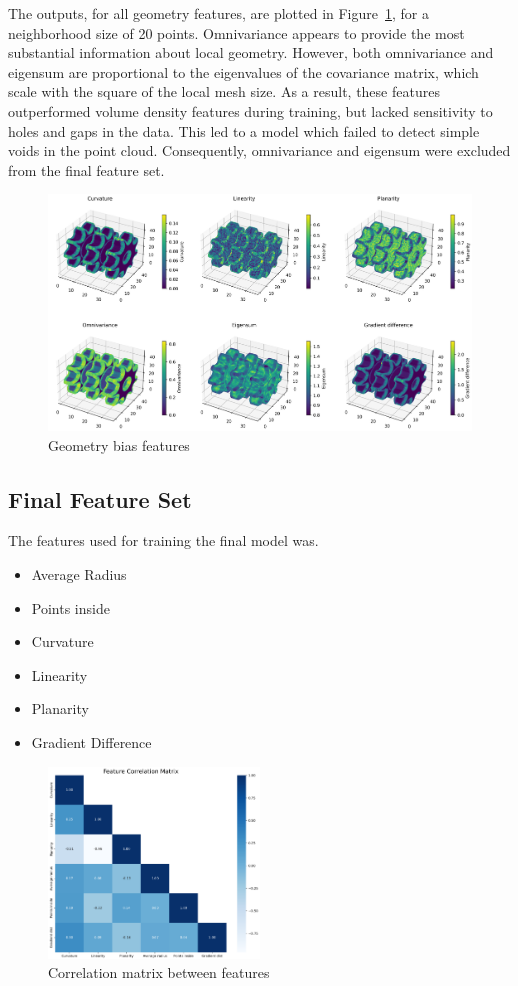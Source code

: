 The outputs, for all geometry features, are plotted in Figure~\ref{fig:feature_plot}, for a neighborhood size of 20 points. Omnivariance appears to provide the most substantial information about local geometry. However, both omnivariance and eigensum are proportional to the eigenvalues of the covariance matrix, which scale with the square of the local mesh size. As a result, these features outperformed volume density features during training, but lacked sensitivity to holes and gaps in the data. This led to a model which failed to detect simple voids in the point cloud. Consequently, omnivariance and eigensum were excluded from the final feature set.

\begin{figure}[h]
    \centering
    \includegraphics[width=\textwidth]{figures/feature_plots_lowQ.png}
    \caption{Geometry bias features}\label{fig:feature_plot}
\end{figure}

\subsection*{Final Feature Set}
The features used for training the final model was.
\begin{itemize}
    \item Average Radius
    \item Points inside
    \item Curvature
    \item Linearity
    \item Planarity
    \item Gradient Difference
\end{itemize}

\begin{figure}[H]
    \centering
    \includegraphics[width=0.5\textwidth]{figures/correlation_matrix_final_lowQ.png}
    \caption{Correlation matrix between features}\label{fig:feature_correlation}
\end{figure}